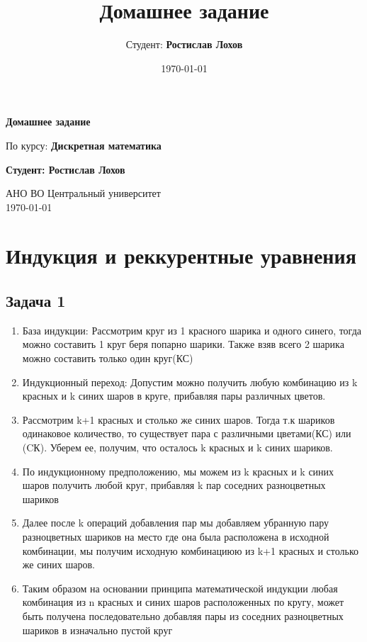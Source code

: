 \documentclass[a4paper,12pt]{article}
\title{Домашнее задание}
\author{Студент: \textbf{Ростислав Лохов}}
\date{\today}
\begin{document}
\begin{titlepage}
    \centering
    \vspace*{1cm}

    \Huge
    \textbf{Домашнее задание}

    \vspace{0.5cm}
    \LARGE
    По курсу: \textbf{Дискретная математика}

    \vspace{1.5cm}

    \textbf{Студент: Ростислав Лохов}

    \vfill

    \Large
    АНО ВО Центральный университет\\
    \vspace{0.3cm}
    \today

\end{titlepage}

\tableofcontents
\newpage

\section{Индукция и реккурентные уравнения}


\subsection{Задача 1}
\begin{enumerate}
    \item База индукции: Рассмотрим круг из 1 красного шарика и одного синего, тогда можно составить 1 круг беря попарно шарики. Также взяв всего 2 шарика можно составить только один круг(КС)
    \item Индукционный переход: Допустим можно получить  любую комбинацию из k красных и k синих шаров в круге, прибавляя пары различных цветов.
    \item Рассмотрим k+1 красных и столько же синих шаров. Тогда т.к шариков одинаковое количество, то существует пара с различными цветами(КС) или (CК). Уберем ее, получим, что осталось k красных и k синих шариков.
    \item По индукционному предположению, мы можем из k красных и k синих шаров получить любой круг, прибавляя k пар соседних разноцветных шариков
    \item Далее после k операций добавления пар мы добавляем убранную пару разноцветных шариков на место где она была расположена в исходной комбинации, мы получим исходную комбинациюю из k+1 красных и столько же синих шаров.
    \item Таким образом на основании принципа математической индукции любая комбинация из n красных и синих шаров расположенных по кругу, может быть получена последовательно добавляя пары из соседних разноцветных шариков в изначально пустой круг
\end{enumerate}
\end{document}
